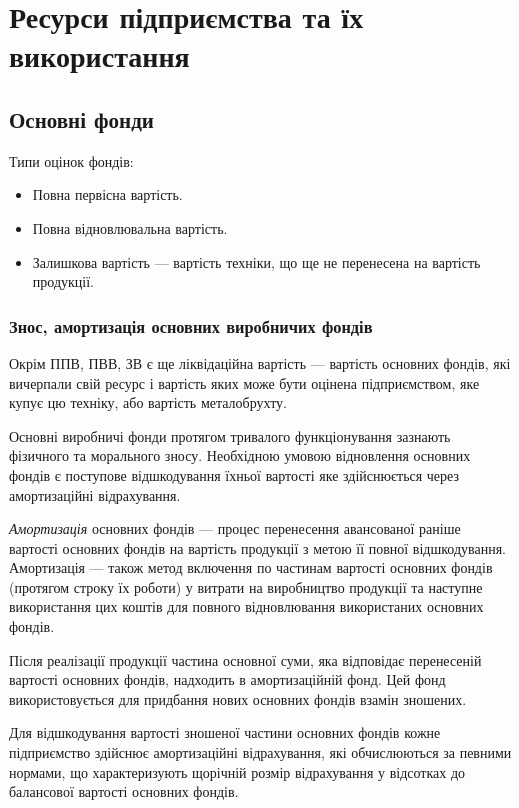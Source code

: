 \documentclass[a4paper,10pt,notitlepage,pdftex,headsepline]{scrartcl}
\begin{document}
\section{Ресурси підприємства та їх використання}
  \subsection{Основні фонди}
    Типи оцінок фондів:
    \begin{itemize}
      \item Повна первісна вартість.
      \item Повна відновлювальна вартість.
      \item Залишкова вартість --- вартість техніки, що ще не перенесена на
        вартість продукції.
    \end{itemize}

    \subsubsection{Знос, амортизація основних виробничих фондів}
      Окрім ППВ, ПВВ, ЗВ є ще ліквідаційна вартість --- вартість основних
      фондів, які вичерпали свій ресурс і вартість яких може бути оцінена
      підприємством, яке купує цю техніку, або вартість металобрухту.

      Основні виробничі фонди протягом тривалого функціонування зазнають
      фізичного та морального зносу.
      Необхідною умовою відновлення основних фондів є поступове відшкодування
      їхньої вартості яке здійснюється через амортизаційні відрахування.

      \emph{Амортизація} основних фондів --- процес перенесення авансованої
      раніше вартості основних фондів на вартість продукції з метою її повної
      відшкодування.
      Амортизація --- також метод включення по частинам вартості основних фондів
      (протягом строку їх роботи) у витрати на виробництво продукції та наступне
      використання цих коштів для повного відновлювання використаних основних
      фондів.

      Після реалізації продукції частина основної суми, яка відповідає
      перенесеній вартості основних фондів, надходить в амортизаційній фонд.
      Цей фонд використовується для придбання нових основних фондів взамін
      зношених.

      Для відшкодування вартості зношеної частини основних фондів кожне
      підприємство здійснює амортизаційні відрахування, які обчислюються за
      певними нормами, що характеризують щорічній розмір відрахування у
      відсотках до балансової вартості основних фондів.
\end{document}
